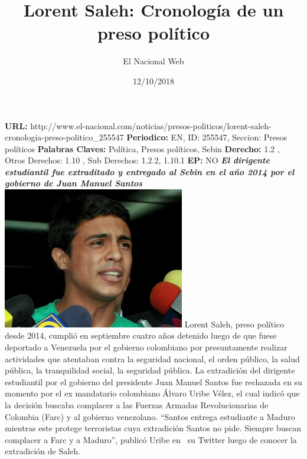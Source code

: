 \documentclass{article}%
\title{\textbf{Lorent Saleh: Cronología de un preso político}}%
\author{El Nacional Web}%
\date{12/10/2018}%
\begin{document}
%
\normalsize%
\maketitle%
\textbf{URL: }%
http://www.el{-}nacional.com/noticias/presos{-}politicos/lorent{-}saleh{-}cronologia{-}preso{-}politico\_255547\newline%
%
\textbf{Periodico: }%
EN, %
ID: %
255547, %
Seccion: %
Presos políticos\newline%
%
\textbf{Palabras Claves: }%
Política, Presos políticos, Sebin\newline%
%
\textbf{Derecho: }%
1.2%
, Otros Derechos: %
1.10%
, Sub Derechos: %
1.2.2, 1.10.1%
\newline%
%
\textbf{EP: }%
NO\newline%
\newline%
%
\textbf{\textit{El dirigente estudiantil fue extraditado y entregado al Sebin en el año 2014 por el gobierno de Juan Manuel Santos}}%
\newline%
\newline%
%
\includegraphics[width=300px]{111.jpg}%
\newline%
%
Lorent Saleh, preso político desde 2014, cumplió en septiembre cuatro años detenido luego de que fuese deportado a Venezuela por el gobierno colombiano por presuntamente realizar actividades que atentaban contra la seguridad nacional, el orden público, la salud pública, la tranquilidad social, la seguridad pública.%
\newline%
%
La extradición del dirigente estudiantil por el gobierno del presidente Juan Manuel Santos fue rechazada en su momento por el ex mandatario colombiano Álvaro Uribe Vélez, el cual indicó que la decisión buscaba complacer a las Fuerzas Armadas Revolucionarias de Colombia (Farc) y al gobierno venezolano.%
\newline%
%
“Santos entrega estudiante a Maduro mientras este protege terroristas cuya extradición Santos no pide. Siempre buscan complacer a Farc y a Maduro”, publicó Uribe en~ su Twitter luego de conocer la extradición de Saleh.%
\end{document}
